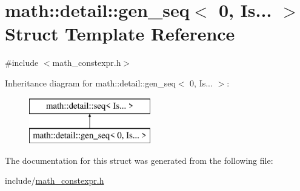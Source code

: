 \hypertarget{structmath_1_1detail_1_1gen__seq_3_010_00_01_is_8_8_8_01_4}{}\section{math\+:\+:detail\+:\+:gen\+\_\+seq$<$ 0, Is... $>$ Struct Template Reference}
\label{structmath_1_1detail_1_1gen__seq_3_010_00_01_is_8_8_8_01_4}


{\ttfamily \#include $<$math\+\_\+constexpr.\+h$>$}

Inheritance diagram for math\+:\+:detail\+:\+:gen\+\_\+seq$<$ 0, Is... $>$\+:\begin{figure}[H]
\begin{center}
\leavevmode
\includegraphics[height=2.000000cm]{structmath_1_1detail_1_1gen__seq_3_010_00_01_is_8_8_8_01_4}
\end{center}
\end{figure}


The documentation for this struct was generated from the following file\+:\begin{DoxyCompactItemize}
\item 
include/\hyperlink{math__constexpr_8h}{math\+\_\+constexpr.\+h}\end{DoxyCompactItemize}
